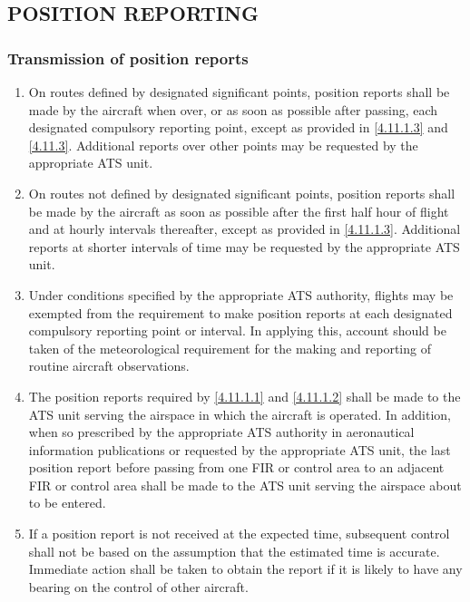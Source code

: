 \subsection[Position reporting]{POSITION REPORTING}

\subsubsection{Transmission of position reports}

\begin{enumerate}
    \item \label{4.11.1.1} On routes defined by designated significant points, position reports shall be made by the aircraft when over, or as soon as possible after passing, each designated compulsory reporting point, except as provided in \ref{4.11.1.3} and \ref{4.11.3}. Additional reports over other points may be requested by the appropriate ATS unit.
    \item \label{4.11.1.2} On routes not defined by designated significant points, position reports shall be made by the aircraft as soon as possible after the first half hour of flight and at hourly intervals thereafter, except as provided in \ref{4.11.1.3}. Additional reports at shorter intervals of time may be requested by the appropriate ATS unit.
    \item \label{4.11.1.3} Under conditions specified by the appropriate ATS authority, flights may be exempted from the requirement to make position reports at each designated compulsory reporting point or interval. In applying this, account should be taken of the meteorological requirement for the making and reporting of routine aircraft observations.
    \item The position reports required by \ref{4.11.1.1} and \ref{4.11.1.2} shall be made to the ATS unit serving the airspace in which the aircraft is operated. In addition, when so prescribed by the appropriate ATS authority in aeronautical information publications or requested by the appropriate ATS unit, the last position report before passing from one FIR or control area to an adjacent FIR or control area shall be made to the ATS unit serving the airspace about to be entered.
    \item If a position report is not received at the expected time, subsequent control shall not be based on the assumption that the estimated time is accurate. Immediate action shall be taken to obtain the report if it is likely to have any bearing on the control of other aircraft.
\end{enumerate}

